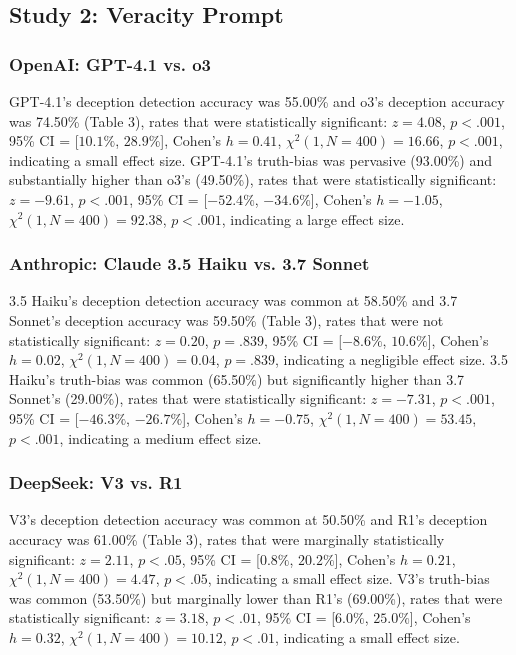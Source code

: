 \documentclass{article}
\begin{document}
\subsection{Study 2: Veracity Prompt}

\subsubsection{OpenAI: GPT-4.1 vs. o3}

GPT-4.1's deception detection accuracy was 55.00\% and o3's deception accuracy was 74.50\% (Table 3), rates that were statistically significant:  $z = 4.08$, $p < .001$, 95\% CI = [$10.1\%$, $28.9\%$], Cohen’s $h =0.41$, $\chi^2(1, N = 400) = 16.66$, $p < .001$, indicating a small effect size. GPT-4.1's truth-bias was pervasive (93.00\%) and substantially higher than o3's (49.50\%), rates that were statistically significant: $z = -9.61$, $p < .001$, 95\% CI = [$-52.4\%$, $-34.6\%$], Cohen’s $h = -1.05$, $\chi^2(1, N = 400) = 92.38$, $p < .001$, indicating a large effect size.

\subsubsection{Anthropic: Claude 3.5 Haiku vs. 3.7 Sonnet}

3.5 Haiku's deception detection accuracy was common at 58.50\% and 3.7 Sonnet's deception accuracy was 59.50\% (Table 3), rates that were not statistically significant:  $z = 0.20$, $p = .839$, 95\% CI = [$-8.6\%$, $10.6\%$], Cohen’s $h =0.02$, $\chi^2(1, N = 400) = 0.04$, $p = .839$, indicating a negligible effect size. 3.5 Haiku's truth-bias was common (65.50\%) but significantly higher than 3.7 Sonnet's (29.00\%), rates that were statistically significant: $z = -7.31$, $p < .001$, 95\% CI = [$-46.3\%$, $-26.7\%$], Cohen’s $h = -0.75$, $\chi^2(1, N = 400) = 53.45$, $p < .001$, indicating a medium effect size.

\subsubsection{DeepSeek: V3 vs. R1}

V3's deception detection accuracy was common at 50.50\% and R1's deception accuracy was 61.00\% (Table 3), rates that were marginally statistically significant:  $z = 2.11$, $p < .05$, 95\% CI = [$0.8\%$, $20.2\%$], Cohen’s $h =0.21$, $\chi^2(1, N = 400) = 4.47$, $p < .05$, indicating a small effect size. V3's truth-bias was common (53.50\%) but marginally lower than R1's (69.00\%), rates that were statistically significant: $z = 3.18$, $p < .01$, 95\% CI = [$6.0\%$, $25.0\%$], Cohen’s $h = 0.32$, $\chi^2(1, N = 400) = 10.12$, $p < .01$, indicating a small effect size.
\end{document}
